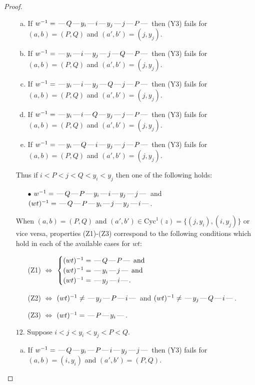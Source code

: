 \documentclass[10pt]{article}
\theoremstyle{definition}
\theoremstyle{definition}
\def\dash{\text{\hspace{0.5mm}---\hspace{0.5mm}}}
\def\Cyc{\mathrm{Cyc}}
\begin{document}
\begin{proof}
\begin{enumerate}
\begin{enumerate}[(a)]
\item If $w^{-1} = \dash Q\dash y_i\dash i\dash y_j\dash j\dash P\dash $ then (Y3) fails for $(a,b)=(P,Q)$ and $(a',b')=(j,y_j)$.
\item If $w^{-1} = \dash y_i\dash i\dash y_j\dash j\dash Q\dash P\dash $ then (Y3) fails for $(a,b)=(P,Q)$ and $(a',b')=(j,y_j)$.
\item If $w^{-1} = \dash y_i\dash i\dash y_j\dash Q\dash j\dash P\dash $ then (Y3) fails for $(a,b)=(P,Q)$ and $(a',b')=(j,y_j)$.
\item If $w^{-1} = \dash y_i\dash i\dash Q\dash y_j\dash j\dash P\dash $ then (Y3) fails for $(a,b)=(P,Q)$ and $(a',b')=(j,y_j)$.
\item If $w^{-1} = \dash y_i\dash Q\dash i\dash y_j\dash j\dash P\dash $ then (Y3) fails for $(a,b)=(P,Q)$ and $(a',b')=(j,y_j)$.
\end{enumerate}
Thus if $i < P < j < Q < y_i < y_j$ then one of the following holds:
\begin{enumerate}
\item[$\bullet$] $w^{-1} = \dash Q\dash P\dash y_i\dash i\dash y_j\dash j\dash $ and $(wt)^{-1} = \dash Q\dash P\dash y_i\dash j\dash y_j\dash i\dash $.
\end{enumerate}
When $(a,b)= (P,Q)$ and $(a',b')\in \Cyc^1(z)=\{(j,y_i),(i,y_j)\}$ or vice versa,
properties (Z1)-(Z3) correspond to the following conditions which
hold in each of the available cases for $wt$:
\begin{enumerate}
\item[](Z1) $\Leftrightarrow$ $\begin{cases}\text{$(wt)^{-1} = \dash Q \dash P \dash$}\text{ and }\\
\text{$(wt)^{-1} = \dash y_i \dash j \dash$}\text{ and }\\
\text{$(wt)^{-1} = \dash y_j \dash i \dash$}.\end{cases}$
\item[](Z2) $\Leftrightarrow$ $(wt)^{-1} \neq \dash y_j \dash P \dash i \dash$ and $(wt)^{-1}\neq \dash y_j \dash Q \dash i \dash$.
\item[](Z3) $\Leftrightarrow$ $(wt)^{-1} = \dash P \dash y_i \dash$.
\end{enumerate}
\item[$12$.] Suppose $i < j < y_i < y_j < P < Q$.
\begin{enumerate}[(a)]
\item If $w^{-1} = \dash Q\dash y_i\dash P\dash i\dash y_j\dash j\dash $ then (Y3) fails for $(a,b)=(i,y_i)$ and $(a',b')=(P,Q)$.

\end{enumerate}
\end{enumerate}
\end{proof}
\end{document}

